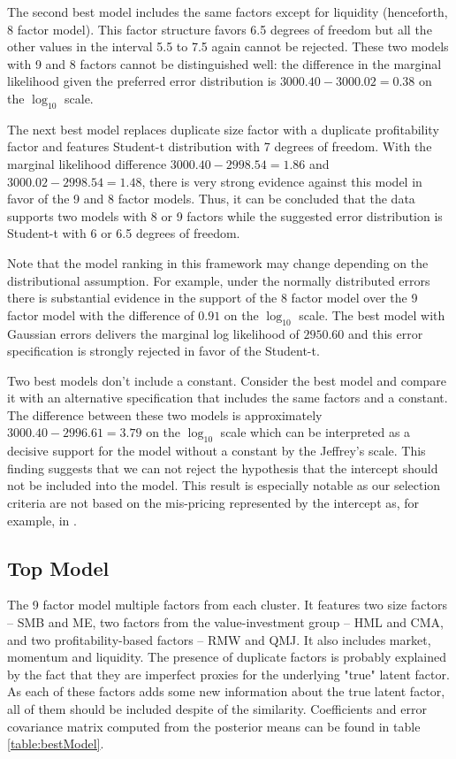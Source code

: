 The second best model includes the same factors except for liquidity (henceforth, 8 factor model). 
This factor structure favors 6.5 degrees of freedom but all the other values in the interval 5.5 to 7.5 again cannot be rejected. 
These two models with 9 and 8 factors cannot be distinguished well: the difference in the marginal likelihood given the preferred error distribution is $3000.40 - 3000.02 = 0.38$ on the $\log_{10}$ scale.

The next best model replaces duplicate size factor with a duplicate profitability factor and features Student-t distribution with 7 degrees of freedom. With the marginal likelihood difference $3000.40 - 2998.54 = 1.86$ and $3000.02 - 2998.54 = 1.48$, there is very strong evidence against this model in favor of the 9 and 8 factor models. 
Thus, it can be concluded that the data supports two models with 8 or 9 factors while the suggested error distribution is Student-t with 6 or 6.5 degrees of freedom.  

Note that the model ranking in this framework  may change depending on the distributional assumption.
For example, under the normally distributed errors there is substantial evidence in the support of the 8 factor model over the 9 factor model with the difference of $0.91$ on the $\log_{10}$ scale. 
The best model with Gaussian errors delivers the marginal log likelihood of $2950.60$  and this error specification is strongly rejected in favor of the Student-t.

Two best models don't include a constant. 
Consider the best model and compare it with an alternative specification that includes the same factors and a constant.
The difference between these two models is approximately $3000.40 - 2996.61 = 3.79$ on the $\log_{10}$ scale which can be interpreted as a decisive support for the model without a constant by the Jeffrey's scale. 
This finding suggests that we can not reject the hypothesis that the intercept should not be included into the model. 
This result is especially notable as our selection criteria are not based on the mis-pricing represented by the intercept as, for example, in \cite{harvey2015lucky}.
\subsection{Top Model}
The 9 factor model multiple factors from each cluster. 
It features two size factors -- SMB and ME, two factors from the value-investment group -- HML and CMA, and two profitability-based factors -- RMW and QMJ. 
It also includes market, momentum and liquidity.
The presence of duplicate factors is probably explained by the fact that they are imperfect proxies for the underlying "true" latent factor. As each of these factors adds some new information about the true latent factor, all of them should be included despite of the similarity. 
Coefficients and error covariance matrix computed from the posterior means can be found in table \ref{table:bestModel}.

